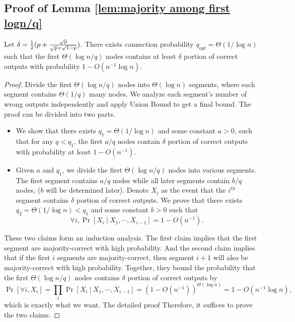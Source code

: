 \documentclass[a4paper,UKenglish]{lipics}
\theoremstyle{definition}
\begin{document}
\subsection {Proof of Lemma \ref{lem:majority among first logn/q}}
\label {subsec:majority among first logn/q}

Let $\delta = {1\over 2}(p + {\sqrt{p}\over \sqrt{p} + \sqrt{1-p}})$.
There exists connection probability $q_{opt} = \Theta(1/\log n)$ such that the first $\Theta(\log n/q)$ nodes 
	contains at least $\delta$ portion of correct outputs with probability $1 - O(n^{-1}\log n)$.

\begin{proof}
Divide the first $\Theta(\log n/q)$ nodes into $\Theta(\log n)$ segments, where each segment contains $\Theta(1/q)$ many nodes.
We analyze each segment's number of wrong outputs independently and apply Union Bound to get a final bound.
The proof can be divided into two parts.
\begin{itemize}
\item We show that there exists $q_1 = \Theta(1/\log n)$ and some constant $a > 0$, such that for any $q < q_1$, 
	the first $a/q$ nodes contain $\delta$ portion of correct outputs with probability at least $1 - O(n^{-1})$.
\item Given $a$ and $q_1$, we divide the first $\Theta(\log n / q)$ nodes into various segments.
	The first segment contains $a/q$ nodes while all later segments contain $b/q$ nodes, ($b$ will be determined later).
	Denote $X_i$ as the event that the $i^{th}$ segment contains $\delta$ portion of correct outputs.
	We prove that there exists $q_2 = \Theta(1/\log n) < q_1$ and some constant $b > 0$ such that
	\begin{equation*}
		\forall i, \Pr[X_{i}~|~X_1, \dotsb, X_{i-1}] = 1 - O(n^{-1}).
	\end{equation*}
\end{itemize}
These two claims form an induction analysis.
The first claim implies that the first segment are majority-correct with high probability.
And the second claim implies that if the first $i$ segments are majority-correct, 
	then segment $i+1$ will also be majority-correct with high probability.
Together, they bound the probability that the first $\Theta(\log n / q)$ nodes contains $\delta$ portion of correct outputs by
\begin{equation*}
	\Pr[ \forall i, X_i] 
= 
	\prod_{i} \Pr[X_{i}~|~X_1, \dotsb, X_{i-1}] 
= 
	(1 - O(n^{-1}))^{\Theta(\log n)} = 1 - O(n^{-1}\log n),
\end{equation*}
which is exactly what we want.
The detailed proof 
Therefore, it suffices to prove the two claims.


\end{proof}
\end{document}
